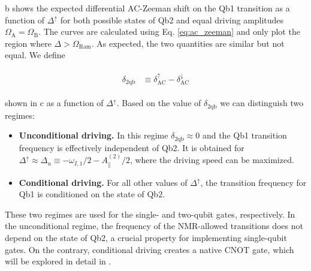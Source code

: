 b shows the expected differential AC-Zeeman shift on the Qb1 transition as a function of $\Delta^{\uparrow}$ for both possible states of Qb2 and equal driving amplitudes $\Omega_\text{A} = \Omega_\text{B}$. The curves are calculated using Eq. \ref{eq:ac_zeeman} and only plot the region where $\Delta > \Omega_\text{Ram}$. As expected, the two quantities are similar but not equal. We define

\begin{align}
\begin{split}
    \delta_\mathrm{2qb} &\equiv \delta^\uparrow_\text{AC} - \delta^\downarrow_\text{AC}
\end{split}
\end{align}

shown in c as a function of $\Delta^\uparrow$. Based on the value of $\delta_\mathrm{2qb}$ we can distinguish two regimes:

\newpage

\begin{itemize}
    \item \textbf{Unconditional driving.} In this regime $\delta_\mathrm{2qb}\approx0$ and the Qb1 transition frequency is effectively independent of Qb2. It is obtained for $\Delta^{\uparrow} \approx \Delta_u \equiv -\omega_{I,1}/2 - A_\parallel^{(2)}/2$, where the driving speed can be maximized.
    \item \textbf{Conditional driving.} For all other values of $\Delta^{\uparrow}$, the transition frequency for Qb1 is conditioned on the state of Qb2.
\end{itemize}

These two regimes are used for the single- and two-qubit gates, respectively. In the unconditional regime, the frequency of the NMR-allowed transitions does not depend on the state of Qb2, a crucial property for implementing single-qubit gates. On the contrary, conditional driving creates a native CNOT gate, which will be explored in detail in .


